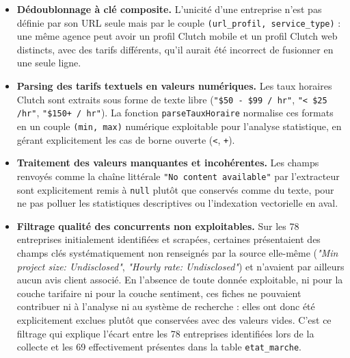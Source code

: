 \begin{itemize}
    \item \textbf{Dédoublonnage à clé composite.} L'unicité d'une entreprise n'est pas définie par son URL
    seule mais par le couple \texttt{(url\_profil, service\_type)} : une même agence peut avoir un profil
    Clutch mobile et un profil Clutch web distincts, avec des tarifs différents, qu'il aurait été incorrect
    de fusionner en une seule ligne.
    \item \textbf{Parsing des tarifs textuels en valeurs numériques.} Les taux horaires Clutch sont extraits
    sous forme de texte libre (\texttt{"\$50 - \$99 / hr"}, \texttt{"< \$25 /hr"}, \texttt{"\$150+ / hr"}).
    La fonction \texttt{parseTauxHoraire} normalise ces formats en un couple \texttt{(min, max)} numérique
    exploitable pour l'analyse statistique, en gérant explicitement les cas de borne ouverte (\texttt{<},
    \texttt{+}).
    \item \textbf{Traitement des valeurs manquantes et incohérentes.} Les champs renvoyés comme la chaîne
    littérale \texttt{"No content available"} par l'extracteur sont explicitement remis à \texttt{null}
    plutôt que conservés comme du texte, pour ne pas polluer les statistiques descriptives ou l'indexation
    vectorielle en aval.
    \item \textbf{Filtrage qualité des concurrents non exploitables.} Sur les 78 entreprises initialement
    identifiées et scrapées, certaines présentaient des champs clés systématiquement non renseignés par la
    source elle-même (\textit{"Min project size: Undisclosed"}, \textit{"Hourly rate: Undisclosed"}) et
    n'avaient par ailleurs aucun avis client associé. En l'absence de toute donnée exploitable, ni pour la
    couche tarifaire ni pour la couche sentiment, ces fiches ne pouvaient contribuer ni à l'analyse ni au
    système de recherche : elles ont donc été explicitement exclues plutôt que conservées avec des valeurs
    vides. C'est ce filtrage qui explique l'écart entre les 78 entreprises identifiées lors de la collecte et
    les 69 effectivement présentes dans la table \texttt{etat\_marche}.
\end{itemize}

